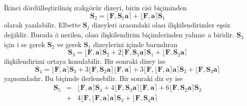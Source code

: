 \documentclass[a4paper,10pt]{article}
\begin{document}
\.Ikinci d\"ord\"ulle\c{s}tirilmi\c{s} \i rakg\"or\"ur dizeyi, birin%
cisi bi\c{c}iminden %
\begin{equation}
 \mathbf{S}_{2} = 
 \lfloor \mathbf{F} , \mathbf{S}_{1}\mathbf{a} \rceil
 + \lfloor \mathbf{F} , 
 \mathbf{a} \rceil \mathbf{S}_{1}
\end{equation}
olarak yaz\i labilir. Elbette %
$\mathbf{S}_{j}$ dizeyleri aras\i ndaki %
olas{\i} ili\c{s}kilendirimler e\c{s}siz de\u{g}ildir. Burada \"o%
nerilen, olas{\i} ili\c{s}kilendirim bi\c{c}imlerinden yaln{\i}zc%
a biridir. $\mathbf{S}_{3}$ i\-\c{c}in i%
se gerek $\mathbf{S}_{2}$ ve gerek %
$\mathbf{S}_{1}$ dizeylerini i\c{c}inde %
bar\i nd\i ran %
\begin{equation}
 \mathbf{S}_{3} =
 \lfloor \mathbf{F} , \mathbf{a} \rceil 
 \mathbf{S}_{2}
 + 2 \lfloor \mathbf{F} , \mathbf{S}_{1}\mathbf{a} \rceil
 \mathbf{S}_{1}
 + \lfloor \mathbf{F} , \mathbf{S}_{2}\mathbf{a} \rceil
\end{equation}
ili\c{s}kilendirimi ortaya konulabilir. Bir sonraki dizey ise %
\begin{equation}
 \mathbf{S}_{4} = 
 \lfloor \mathbf{F} , \mathbf{a} \rceil 
 \mathbf{S}_{3}
 + 3 \lfloor \mathbf{F} , \mathbf{S}_{2}\mathbf{a} \rceil
 \lfloor \mathbf{F} , \mathbf{a} \rceil 
 + 3 \lfloor \mathbf{F} , \lfloor \mathbf{F} , 
 \mathbf{a} \rceil \mathbf{a} \rceil
 \mathbf{S}_{2}
 + \lfloor \mathbf{F} , \mathbf{S}_{3}\mathbf{a} \rceil
\end{equation}
yap\i s\i ndad\i r. Bu bi\c{c}imde ilerlenebilir. Bir sonraki diz%
ey ise %
\begin{eqnarray}
 \mathbf{S}_{5} &=&
 \lfloor \mathbf{F} , \mathbf{a} \rceil 
 \mathbf{S}_{4}
 + 4 \lfloor \mathbf{F} , \mathbf{S}_{3}\mathbf{a} \rceil
 \lfloor \mathbf{F} , \mathbf{a} \rceil
 + 6 \lfloor \mathbf{F} , \mathbf{S}_{2}\mathbf{a} \rceil
 \mathbf{S}_{2} \nonumber\\
 &+& 4  \lfloor \mathbf{F} ,  \lfloor \mathbf{F} , 
 \mathbf{a} \rceil  
 \mathbf{a} \rceil \mathbf{S}_{3}
 +  \lfloor \mathbf{F} , %
 \mathbf{S}_{4}\mathbf{a} \rceil
\end{eqnarray}
\end{document}
